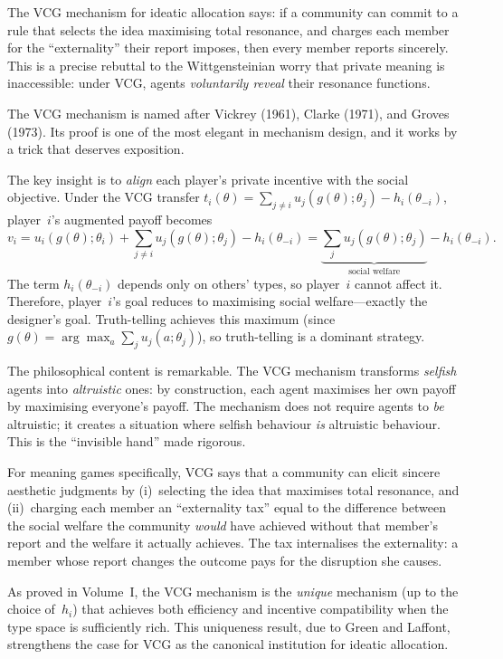 \begin{interpretation}
The VCG mechanism for ideatic allocation says: if a community can
commit to a rule that selects the idea maximising total resonance,
and charges each member for the ``externality'' their report imposes,
then every member reports sincerely.  This is a precise rebuttal to
the Wittgensteinian worry that private meaning is inaccessible:
under VCG, agents \emph{voluntarily reveal} their resonance
functions.
\end{interpretation}

\begin{remark}
The VCG mechanism is named after Vickrey (1961), Clarke (1971), and
Groves (1973).  Its proof is one of the most elegant in mechanism design,
and it works by a trick that deserves exposition.

The key insight is to \emph{align} each player's private incentive
with the social objective.  Under the VCG transfer
$t_i(\theta) = \sum_{j \neq i} u_j(g(\theta); \theta_j) - h_i(\theta_{-i})$,
player~$i$'s augmented payoff becomes
\[
  v_i = u_i(g(\theta); \theta_i) + \sum_{j \neq i} u_j(g(\theta); \theta_j) - h_i(\theta_{-i})
  = \underbrace{\sum_j u_j(g(\theta); \theta_j)}_{\text{social welfare}} - h_i(\theta_{-i}).
\]
The term $h_i(\theta_{-i})$ depends only on others' types, so player~$i$
cannot affect it.  Therefore, player~$i$'s goal reduces to maximising
social welfare---exactly the designer's goal.  Truth-telling achieves
this maximum (since $g(\theta) = \arg\max_a \sum_j u_j(a; \theta_j)$),
so truth-telling is a dominant strategy.

The philosophical content is remarkable.  The VCG mechanism transforms
\emph{selfish} agents into \emph{altruistic} ones: by construction,
each agent maximises her own payoff by maximising everyone's payoff.
The mechanism does not require agents to \emph{be} altruistic; it
creates a situation where selfish behaviour \emph{is} altruistic
behaviour.  This is the ``invisible hand'' made rigorous.

For meaning games specifically, VCG says that a community can elicit
sincere aesthetic judgments by (i)~selecting the idea that maximises
total resonance, and (ii)~charging each member an ``externality tax''
equal to the difference between the social welfare the community
\emph{would} have achieved without that member's report and the welfare
it actually achieves.  The tax internalises the externality: a member
whose report changes the outcome pays for the disruption she causes.

As proved in Volume~I, the VCG mechanism is the \emph{unique}
mechanism (up to the choice of~$h_i$) that achieves both efficiency
and incentive compatibility when the type space is sufficiently rich.
This uniqueness result, due to Green and Laffont,
strengthens the case for VCG as the canonical institution for
ideatic allocation.
\end{remark}

